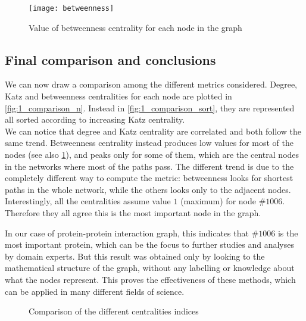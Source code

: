 \begin{figure} [!ht]
	\centering
	\texttt{[image: betweenness]}
	\caption{Value of betweenness centrality for each node in the graph}
	\label{fig:1_between}
\end{figure}

\subsection{Final comparison and conclusions}
We can now draw a comparison among the different metrics considered. Degree, Katz and betweenness centralities for each node are plotted in \cref{fig:1_comparison_n}. Instead in \cref{fig:1_comparison_sort}, they are represented all sorted according to increasing Katz centrality.\\
We can notice that degree and Katz centrality are correlated and both follow the same trend. Betweenness centrality instead produces low values for most of the nodes (see also \cref{fig:1_between}), and peaks only for some of them, which are the central nodes in the networks where most of the paths pass. The different trend is due to the completely different way to compute the metric: betweenness looks for shortest paths in the whole network, while the others looks only to the adjacent nodes.
\\Interestingly, all the centralities assume value $1$ (maximum) for node $\#1006$. Therefore they all agree this is the most important node in the graph. 

In our case of protein-protein interaction graph, this indicates that $\#1006$ is the most important protein, which can be the focus to further studies and analyses by domain experts. But this result was obtained only by looking to the mathematical structure of the graph, without any labelling or knowledge about what the nodes represent. This proves the effectiveness of these methods, which can be applied in many different fields of science.

\begin{figure}[!ht]
	\centering
	\null\hfill
	\hfill
	\null\hfill
	\caption{Comparison of the different centralities indices}
	\label{fig:comparison}
\end{figure}
